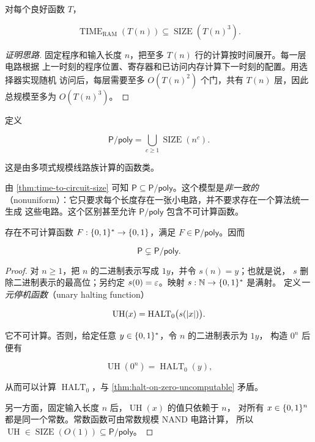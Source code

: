 \begin{theorem}[从运行时间到线路规模]
  \label{thm:time-to-circuit-size}
  对每个良好函数 $T$，

  \[
    \operatorname{TIME}_{\mathrm{RAM}}(T(n))
      \subseteq\operatorname{SIZE}(T(n)^3).
  \]
\end{theorem}

\begin{proof}[证明思路]
  固定程序和输入长度 $n$，把至多 $T(n)$ 行的计算按时间展开。每一层电路根据
  上一时刻的程序位置、寄存器和已访问内存计算下一时刻的配置。用选择器实现随机
  访问后，每层需要至多 $O(T(n)^2)$ 个门，共有 $T(n)$ 层，因此总规模至多为
  $O(T(n)^3)$。
\end{proof}

\begin{definition}[多项式规模线路]
  \label{def:p-poly}
  定义

  \[
    \mathsf{P/poly}
      =\bigcup_{c\geq 1}\operatorname{SIZE}(n^c).
  \]

  这是由多项式规模线路族计算的函数类。
\end{definition}

由 \cref{thm:time-to-circuit-size} 可知
$\mathsf P\subseteq\mathsf{P/poly}$。这个模型是\emph{非一致的}
（nonuniform）：它只要求每个长度存在一张小电路，并不要求存在一个算法统一生成
这些电路。这个区别甚至允许 $\mathsf{P/poly}$ 包含不可计算函数。

\begin{theorem}
  \label{thm:p-poly-uncomputable}
  存在不可计算函数 $F:\{0,1\}^{*}\to\{0,1\}$，满足
  $F\in\mathsf{P/poly}$。因而

  \[
    \mathsf P\subsetneq\mathsf{P/poly}.
  \]
\end{theorem}

\begin{proof}
  对 $n\geq 1$，把 $n$ 的二进制表示写成 $1y$，并令 $s(n)=y$；也就是说，
  $s$ 删除二进制表示的最高位；另约定 $s(0)=\varepsilon$。映射
  $s:\mathbb{N}\to\{0,1\}^{*}$ 是满射。
  定义\emph{一元停机函数}（unary halting function）

  \[
    \operatorname{UH}(x)
      =\operatorname{HALT}_0\bigl(s(\lvert x\rvert)\bigr).
  \]

  它不可计算。否则，给定任意 $y\in\{0,1\}^{*}$，令 $n$ 的二进制表示为 $1y$，
  构造 $0^n$ 后便有

  \[
    \operatorname{UH}(0^n)=\operatorname{HALT}_0(y),
  \]

  从而可以计算 $\operatorname{HALT}_0$，与
  \cref{thm:halt-on-zero-uncomputable} 矛盾。

  另一方面，固定输入长度 $n$ 后，$\operatorname{UH}(x)$ 的值只依赖于 $n$，
  对所有 $x\in\{0,1\}^n$ 都是同一个常数。常数函数可由常数规模 NAND 电路计算，
  所以 $\operatorname{UH}\in\operatorname{SIZE}(O(1))\subseteq\mathsf{P/poly}$。
\end{proof}
